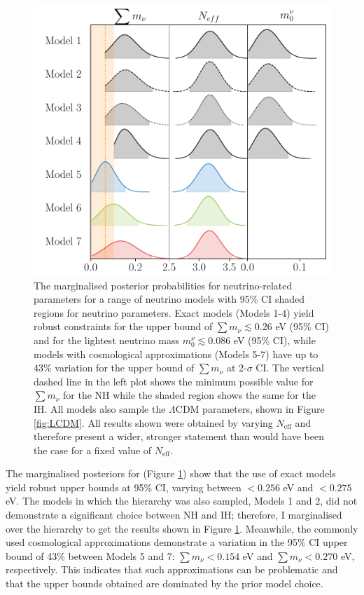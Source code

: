 \begin{figure}
\begin{center}
\includegraphics[width=\columnwidth]{Neutrino-FIGS/neutrino_prior_models.pdf}
\caption[Results for neutrino related parameters from the neutrino model prior analysis.]{The marginalised posterior probabilities for neutrino-related parameters for a range of neutrino models with 95\% CI shaded regions for neutrino parameters. Exact models (Models 1-4) yield  robust constraints for the upper bound of $\sum m_{\nu} \lesssim 0.26$ eV (95\% CI) and for the lightest neutrino mass $m_0^{\nu} \lesssim 0.086$ eV (95\% CI), while models with cosmological approximations (Models 5-7) have up to 43\% variation for the upper bound of $\sum m_{\nu}$ at 2-$\sigma$ CI. The vertical dashed line in the left plot shows the minimum possible value for $\sum m_{\nu}$ for the NH while the shaded region shows the same for the IH. All models also sample the $\Lambda$CDM parameters, shown in Figure \ref{fig:LCDM}. All results shown  were obtained by varying $N_{\text{eff}}$ and therefore present a wider, stronger statement than would have been the case for a fixed value of $N_{\text{eff}}$. }
\label{fig:neutrinoCompare1}
\end{center}
\vspace{-2.5mm}
\end{figure}
\qquad The marginalised posteriors for \NM{} (Figure \ref{fig:neutrinoCompare1}) show that the use of exact models yield robust upper bounds at 95\% CI, varying between $< 0.256$ eV and $<0.275$ eV. The models in which the hierarchy was also sampled, Models 1 and 2, did not demonstrate a significant choice between NH and IH; therefore, I marginalised over the hierarchy to get the results shown in Figure \ref{fig:neutrinoCompare1}. Meanwhile, the commonly used cosmological approximations demonstrate a variation in the 95\% CI upper bound of 43\% between Models 5 and 7: $\sum m_{\nu} < 0.154$ eV and $\sum m_{\nu} < 0.270$ eV, respectively. This indicates that such approximations can be problematic and that the upper bounds obtained are dominated by the prior model choice.

